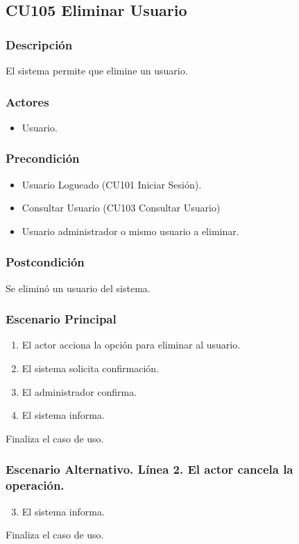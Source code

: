 \subsection{CU105 Eliminar Usuario}
\subsubsection{Descripci\'{o}n}
El sistema permite que elimine un usuario.
\subsubsection{Actores}
\begin{itemize}
\item Usuario.
\end{itemize}
\subsubsection{Precondici\'{o}n}
\begin{itemize}
\item Usuario Logueado (CU101 Iniciar Sesi\'{o}n).
\item Consultar Usuario (CU103 Consultar Usuario)
\item Usuario administrador o mismo usuario a eliminar.
\end{itemize}
\subsubsection{Postcondici\'{o}n}
Se elimin\'{o} un usuario del sistema.
\subsubsection{Escenario Principal}
\begin{enumerate}
\item El actor acciona la opci\'{o}n para eliminar al usuario.
\item El sistema solicita confirmaci\'{o}n.
\item El administrador confirma.
\item El sistema informa.
\end{enumerate}
Finaliza el caso de uso.
\subsubsection{Escenario Alternativo. L\'{i}nea 2. El actor cancela la operaci\'{o}n.}
\begin{enumerate}
\setcounter{enumi}{2}
\item El sistema informa.
\end{enumerate}
Finaliza el caso de uso.
